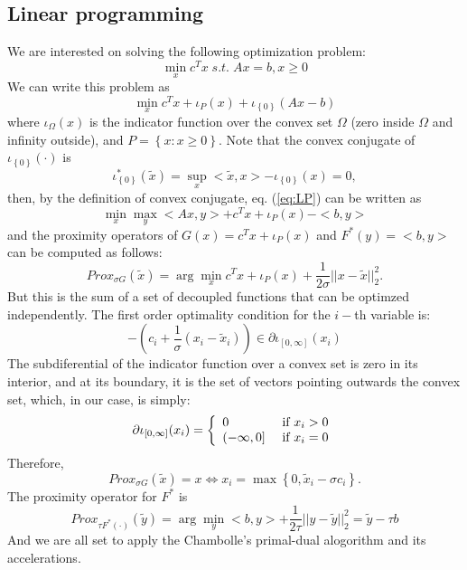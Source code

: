\documentclass[12pt,draftcls, onecolumn, letterpaper,compsoc]{IEEEtran}
\begin{document}
\subsection{Linear programming}
We are interested on solving the following optimization problem:
\begin{equation}
	\min_{x} c^{T}x \;s.t.\; Ax=b, x\geq0
\end{equation}
We can write this problem as
\begin{equation}\label{eq:LP}
	\min_{x} c^{T}x + \iota_{P}(x) + \iota_{\left\lbrace0\right\rbrace}(Ax-b)
\end{equation}
where $\iota_{\Omega}(x)$ is the indicator function over the convex set $\Omega$ (zero inside $\Omega$ and infinity outside), and $P=\left\lbrace x: x\geq0\right\rbrace$. Note that the convex conjugate of $\iota_{\left\lbrace 0\right\rbrace}(\cdot)$ is
\begin{equation}
	\iota_{\left\lbrace 0\right\rbrace}^{*}(\tilde{x}) = \sup_{x} <\tilde{x},x > -\iota_{\left\lbrace 0\right\rbrace}(x) = 0,
\end{equation}
then, by the definition of convex conjugate, eq. (\ref{eq:LP}) can be written as
\begin{equation}\label{eq:LP}
	\min_{x} \max_{y} <Ax, y> + c^{T}x + \iota_{P}(x) - <b,y>
\end{equation}
and the proximity operators of $G(x) = c^{T}x + \iota_{P}(x)$ and $F^{*}(y)=<b,y>$ can be computed as follows:
\begin{equation}\label{eq:LP}
	Prox_{\sigma G}(\tilde{x}) = \arg\min_{x} c^{T}x + \iota_{P}(x) + \frac{1}{2\sigma}||x-\tilde{x}||_{2}^{2}.
\end{equation}
But this is the sum of a set of decoupled functions that can be optimzed independently. The first order optimality condition for the $i-$th variable is:
\begin{equation}
	-\left(c_{i} + \frac{1}{\sigma}(x_{i}-\tilde{x}_{i})\right)\in \partial \iota_{[0,\infty]}(x_{i})
\end{equation}
The subdiferential of the indicator function over a convex set is zero in its interior, and at its boundary, it is the set of vectors pointing outwards the convex set, which, in our case, is simply:
\begin{equation}
	\partial \iota_{[0,\infty]}(x_{i}) = \left\lbrace
	\begin{array}{ll}
		0 & $ if $ x_i> 0\\
		(-\infty, 0] & $ if $ x_{i}=0
	\end{array}
	\right.
\end{equation}
Therefore,
\begin{equation}\label{eq:LP}
	Prox_{\sigma G}(\tilde{x}) = x \Leftrightarrow x_{i} = \max\left\lbrace0, \tilde{x}_i - \sigma c_{i}\right\rbrace.
\end{equation}
The proximity operator for $F^{*}$ is
\begin{equation}
	Prox_{\tau F^{*}(\cdot)}(\tilde{y})=\arg\min_{y} <b,y> + \frac{1}{2\tau}||y-\tilde{y}||_{2}^{2} = \tilde{y} - \tau b
\end{equation}
And we are all set to apply the Chambolle's primal-dual alogorithm and its accelerations.
\end{document}
